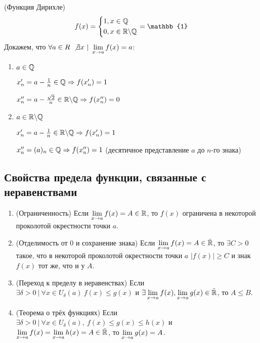 \begin{example} (Функция Дирихле)
	$$
		f(x) = \System{&{1, x \in \Q} \\ &{0, x \in \R \bs \Q}} = \mathbb{1}
	$$
	Докажем, что $\forall a \in R\ \not\exists x\ |\ \lim\limits_{x \rightarrow a} f(x) = a$:
	
	\begin{enumerate}
		\item $a \in \mathbb{Q}$
		
		$x'_n = a - \frac{1}{n} \in \mathbb{Q} \Rightarrow f(x'_n) = 1$
		
		$x''_n = a - \frac{\sqrt{2}}{n} \in \mathbb{R} \backslash \mathbb{Q} \Rightarrow f(x''_n) = 0$
		
		\item $a \in \mathbb{R} \backslash \mathbb{Q}$
		
		$x'_n = a - \frac{1}{n} \in \mathbb{R} \backslash \mathbb{Q} \Rightarrow f(x'_n) = 1$
		
		$x''_n = (a)_n \in \mathbb{Q} \Rightarrow f(x''_n) = 1$ (десятичное представление $a$ до $n$-го знака)
	\end{enumerate}
\end{example}

\subsection{Свойства предела функции, связанные с неравенствами}

\begin{enumerate}
	\item (Ограниченность) Если $\lim\limits_{x \rightarrow a} f(x) = A \in \mathbb{R}$, то $f(x)$ ограничена в некоторой проколотой окрестности точки $a$.
	
	\item (Отделимость от 0 и сохранение знака) Если $\lim\limits_{x \rightarrow a} f(x) = A \in \bar{\mathbb{R}}$, то $\exists C > 0$ такое, что в некоторой проколотой окрестности точки $a$ $|f(x)| \ge C$ и знак $f(x)$ тот же, что и у $A$.
	
	\item (Переход к пределу в неравенствах) Если $\exists \delta > 0\ |\ \forall x \in U_{\delta}(a)\ f(x) \le g(x)$ и $\exists \lim\limits_{x \rightarrow a} f(x), \lim\limits_{x \rightarrow a} g(x) \in \bar{\mathbb{R}}$, то $A \le B$.
	
	\item (Теорема о трёх функциях) Если $\exists \delta > 0\ |\ \forall x \in U_{\delta}(a),\ f(x) \le g(x) \le h(x)$ и $\lim\limits_{x \rightarrow a} f(x) = \lim\limits_{x \rightarrow a} h(x) = A \in \bar{\mathbb{R}}$, то $\lim\limits_{x \rightarrow a} g(x) = A$.
\end{enumerate}

